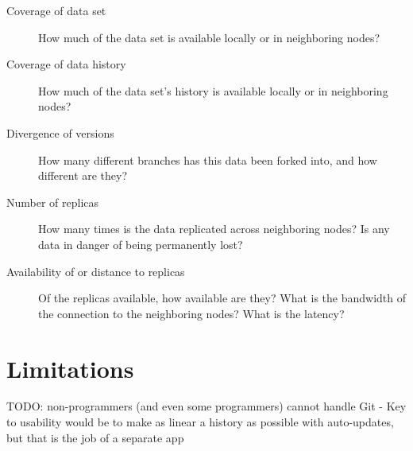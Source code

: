 \begin{description}

  \item[Coverage of data set] How much of the data set is available locally or
    in neighboring nodes?

  \item[Coverage of data history] How much of the data set's history is
    available locally or in neighboring nodes?

  \item[Divergence of versions] How many different branches has this data been
    forked into, and how different are they?

  \item[Number of replicas] How many times is the data replicated across
    neighboring nodes? Is any data in danger of being permanently lost?

  \item[Availability of or distance to replicas] Of the replicas available, how
    available are they? What is the bandwidth of the connection to the
    neighboring nodes? What is the latency?

\end{description}


\section{Limitations}

TODO: non-programmers (and even some programmers) cannot handle Git
    - Key to usability would be to make as linear a history as possible with
    auto-updates, but that is the job of a separate app
